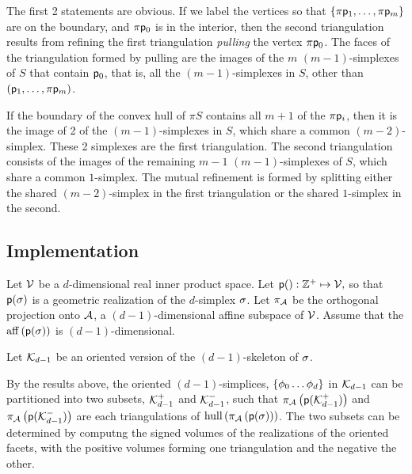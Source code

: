 The first 2 statements are obvious.
If we label the vertices so that $\{\pi \mathsf{p}_1, \ldots , \pi \mathsf{p}_m\}$
are on the boundary, and $\pi \mathsf{p}_0$ is in the interior,
then the second triangulation results from refining the first
triangulation {\it pulling}
\cite{lee-hdcg-17-2004} the vertex $\pi \mathsf{p}_0$.
The faces of the triangulation formed by pulling
are the images of the $m$ $(m-1)$-simplexes
of $S$ that contain $\mathsf{p}_0$, that is, all the $(m-1)$-simplexes in $S$,
other than $(\mathsf{p}_1, \ldots , \pi \mathsf{p}_m)$.

\begin{Theorem}
\label{two-simplex-case}
If the boundary of the convex hull of $\pi S$
contains all $m+1$ of the $\pi \mathsf{p}_i$,
then it is the image of 2 of the $(m-1)$-simplexes in $S$,
which share a common $(m-2)$-simplex.
These 2 simplexes are the first triangulation.
The second triangulation consists of the images
of the remaining $m-1$ $(m-1)$-simplexes of $S$,
which share a common $1$-simplex.
The mutual refinement is formed by splitting either
the shared $(m-2)$-simplex in the first triangulation
or the shared $1$-simplex in the second.
\end{Theorem}

\subsection{Implementation}

Let $\mathcal{V}$ be a $d$-dimensional real inner product space.
Let $\mathsf{p}() : \mathbb{Z}^{+} \mapsto \mathcal{V},$
so that $\mathsf{p}(\sigma)$ is a geometric realization of the $d$-simplex $\sigma$.
Let $\pi_{\mathcal{A}}$ be the orthogonal projection onto
$\mathcal{A}$, a $(d-1)$-dimensional affine subspace of $\mathcal{V}$.
Assume that the $\affine_span \left( \p(\Ssimplex) \right)$
is $(d-1)$-dimensional.

Let $\mathcal{K}_{d-1}$ be an oriented version of the $(d-1)$-skeleton of $\sigma$.

By the results above, the oriented $(d-1)$-simplices,
$\{ \phi_0 \ldots \phi_d \}$ in $\mathcal{K}_{d-1}$
can be partitioned into two subsets, $\mathcal{K}_{d-1}^{+}$
and $\mathcal{K}_{d-1}^{-}$, such that
$\pi_{\mathcal{A}} \left( \mathsf{p} ( \mathcal{K}_{d-1}^{+} ) \right)$
and
$\pi_{\mathcal{A}} \left( \mathsf{p} ( \mathcal{K}_{d-1}^{-} ) \right)$
are each triangulations of
$\convex_span \left( \Projection_{\Aspace} \left( \p ( \Ssimplex ) \right) \right)$.
The two subsets can be determined by computng the signed
volumes of the realizations of the oriented facets,
with the positive volumes forming one triangulation and the negative the other.


